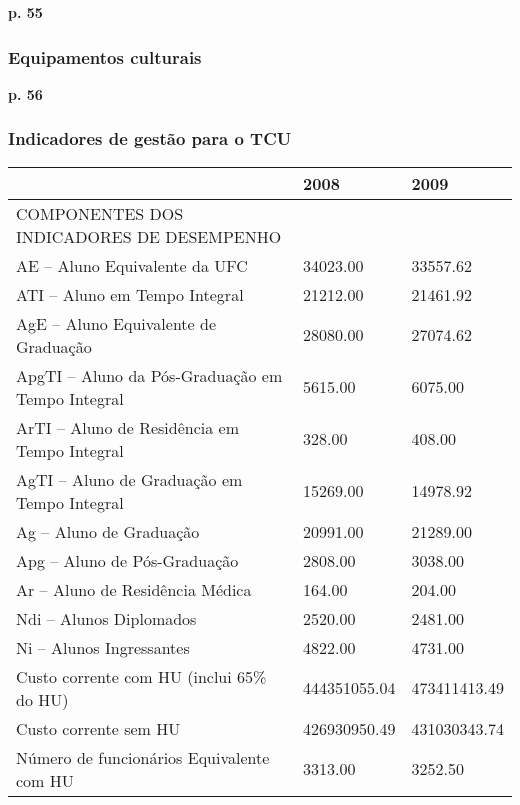 \documentclass{article}
\begin{document}
\textbf{p. 55}

\subsubsection*{Equipamentos culturais}
\textbf{p. 56}

\subsubsection*{Indicadores de gestão para o TCU}
\cite{indicadores_TCU}
\begin{tabular}{lll}
\toprule
{} &          2008 &          2009 \\
\midrule
COMPONENTES DOS INDICADORES DE DESEMPENHO                   &               &               \\
AE – Aluno Equivalente da UFC                             &  34023.00 &  33557.62 \\
ATI – Aluno em Tempo Integral                               &  21212.00 &  21461.92 \\
AgE – Aluno Equivalente de Graduação                        &  28080.00 &  27074.62 \\
ApgTI – Aluno da Pós-Graduação em Tempo Integral            &  5615.00 &  6075.00 \\
ArTI – Aluno de Residência em Tempo Integral                &  328.00 &  408.00 \\
AgTI – Aluno de Graduação em Tempo Integral                 &  15269.00 &  14978.92 \\
Ag – Aluno de Graduação                                     &  20991.00 &  21289.00 \\
Apg – Aluno de Pós-Graduação                                &  2808.00 &  3038.00 \\
Ar – Aluno de Residência Médica                             &  164.00 &  204.00 \\
Ndi – Alunos Diplomados                                     &  2520.00 &  2481.00 \\
Ni – Alunos Ingressantes                                    &  4822.00 &  4731.00 \\
Custo corrente com HU (inclui 65\% do HU)                   &  444351055.04 &  473411413.49 \\
Custo corrente sem HU                                       &  426930950.49 &  431030343.74 \\
Número de funcionários Equivalente com HU                   &  3313.00 &  3252.50 \\

\end{tabular}
\end{document}
